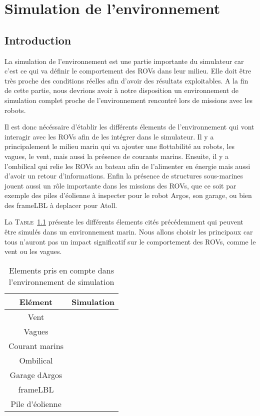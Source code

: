\chapter{Simulation de l'environnement}
	\label{chapitre:environnement}
	
	\section{Introduction}

		La simulation de l'environnement est une partie importante du simulateur car c'est ce qui va définir le comportement des \gls{ROV}s dans leur milieu. Elle doit être très proche des conditions réelles afin d'avoir des résultats exploitables. A la fin de cette partie, nous devrions avoir à notre disposition un environnement de simulation complet proche de l'environnement rencontré lors de missions avec les robots.

		Il est donc nécéssaire d'établir les différents élements de l'environnement qui vont interagir avec les \gls{ROV}s afin de les intégrer dans le simulateur. Il y a principalement le milieu marin qui va ajouter une flottabilité au robots, les vagues, le vent, mais aussi la présence de courants marins. Ensuite, il y a l'ombilical qui relie les \gls{ROV}s au bateau afin de l'alimenter en énergie mais aussi d'avoir un retour d'informations. Enfin la présence de structures sous-marines jouent aussi un rôle importante dans les missions des \gls{ROV}s, que ce soit par exemple des piles d'éolienne à inspecter pour le robot \gls{Argos}, son garage, ou bien des \gls{frameLBL} à deplacer pour \gls{Atoll}.

		La \textsc{Table}~\ref{table:elements} présente les différents élements cités précédemment qui peuvent être simulés dans un environnement marin. Nous allons choisir les principaux car tous n'auront pas un impact significatif sur le comportement des \gls{ROV}s, comme le vent ou les vagues. 

		\begin{table}[ht]
			\centering
			\begin{tabular}{|c|c|}
				\hline
				\textbf{Elément} & \textbf{Simulation} \\
				\hline
				Vent & \xmark\\
				\hline
				Vagues & \xmark\\
				\hline
				Courant marins & \cmark \\
				\hline
				Ombilical & \cmark \\
				\hline
				Garage d\gls{Argos} & \cmark \\
				\hline
				\gls{frameLBL} & \cmark \\
				\hline
				Pile d'éolienne & \cmark \\
				\hline
			\end{tabular}
			\caption{Elements pris en compte dans l'environnement de simulation}
			\label{table:elements}
		\end{table}

